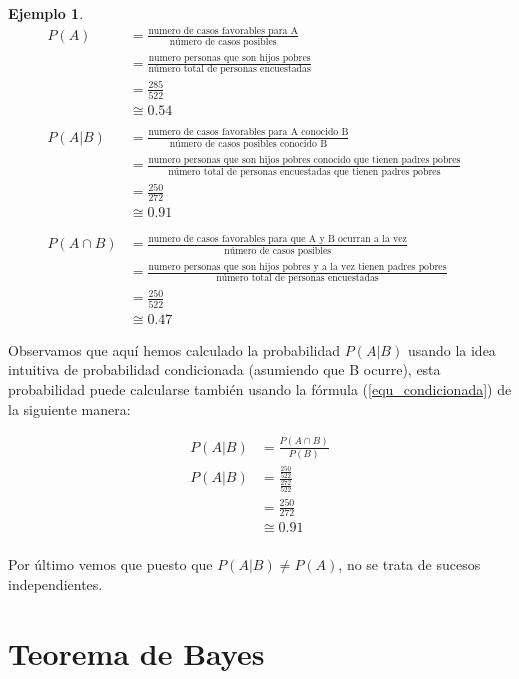 \documentclass[]{book}
\theoremstyle{plain}
\theoremstyle{definition}
\newtheorem{example}[theorem]{Ejemplo}
\theoremstyle{definition} %
\begin{document}
\begin{example}
  \begin{align*}
    P(A)&=\frac{\text{numero de casos favorables para A}}{\text{número de casos posibles}}\\
    &=\frac{\text{numero personas que son hijos pobres}}{\text{número total de personas encuestadas}}\\
    &=\frac{285}{522}\\
    &\cong 0.54
    &\\
    &\\
    P(A|B)&=\frac{\text{numero de casos favorables para A conocido B}}{\text{número de casos posibles conocido B}}\\
    &=\frac{\text{numero personas que son hijos pobres conocido que tienen padres pobres}}{\text{número total de personas encuestadas que tienen padres pobres}}\\
    &=\frac{250}{272}\\
    &\cong 0.91\\
    &\\
    &\\
    P(A\cap B)&=\frac{\text{numero de casos favorables para que A y B ocurran a la vez}}{\text{número de casos posibles}}\\
    &=\frac{\text{numero personas que son hijos pobres y a la vez tienen padres pobres}}{\text{número total de personas encuestadas}}\\
    &=\frac{250}{522}\\
    &\cong 0.47
  \end{align*}

  Observamos que aquí hemos calculado la probabilidad $P(A|B)$ usando la idea intuitiva de probabilidad condicionada (asumiendo que B ocurre), 
  esta probabilidad puede calcularse también usando la fórmula (\ref{equ_condicionada}) de la siguiente manera:

  \begin{align*}
    P(A|B)&= \frac{P(A\cap B)}{P(B)}\\
    P(A|B)&=\frac{\frac{250}{522}}{\frac{272}{522}}\\
    &=\frac{250}{272}\\
    &\cong 0.91\\  
  \end{align*}

  Por último vemos que puesto que $P(A|B) \not = P(A)$, no se trata de sucesos independientes.
\end{example}



\hypertarget{teorema-de-bayes}{%
\section{Teorema de Bayes}\label{teorema-de-bayes}}
\end{document}
